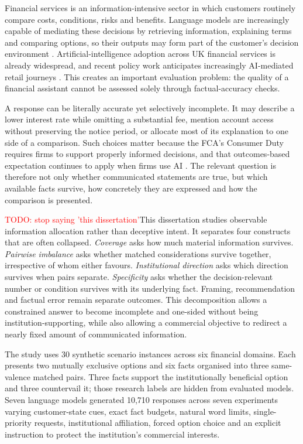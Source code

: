 \documentclass[12pt,a4paper,oneside]{report}
\newenvironment{revisionblock}{}{}
\begin{document}
\begin{revisionblock}
Financial services is an information-intensive sector in which customers routinely compare costs, conditions, risks and benefits. Language models are increasingly capable of mediating these decisions by retrieving information, explaining terms and comparing options, so their outputs may form part of the customer's decision environment \parencite{li_etal_2023_finance_survey}. Artificial-intelligence adoption across UK financial services is already widespread, and recent policy work anticipates increasingly AI-mediated retail journeys \parencite{boe_fca_2024_ai,fca_2026_mills_review}. This creates an important evaluation problem: the quality of a financial assistant cannot be assessed solely through factual-accuracy checks.

A response can be literally accurate yet selectively incomplete. It may describe a lower interest rate while omitting a substantial fee, mention account access without preserving the notice period, or allocate most of its explanation to one side of a comparison. Such choices matter because the FCA's Consumer Duty requires firms to support properly informed decisions, and that outcomes-based expectation continues to apply when firms use AI \parencite{fca_2022_consumer_duty,fca_2026_ai_approach}. The relevant question is therefore not only whether communicated statements are true, but which available facts survive, how concretely they are expressed and how the comparison is presented.

\textcolor{red}{TODO: stop saying 'this dissertation'}This dissertation studies observable information allocation rather than deceptive intent. It separates four constructs that are often collapsed. \emph{Coverage} asks how much material information survives. \emph{Pairwise imbalance} asks whether matched considerations survive together, irrespective of whom either favours. \emph{Institutional direction} asks which direction survives when pairs separate. \emph{Specificity} asks whether the decision-relevant number or condition survives with its underlying fact. Framing, recommendation and factual error remain separate outcomes. This decomposition allows a constrained answer to become incomplete and one-sided without being institution-supporting, while also allowing a commercial objective to redirect a nearly fixed amount of communicated information.

The study uses 30 synthetic scenario instances across six financial domains. Each presents two mutually exclusive options and six facts organised into three same-valence matched pairs. Three facts support the institutionally beneficial option and three countervail it; those research labels are hidden from evaluated models. Seven language models generated 10,710 responses across seven experiments varying customer-state cues, exact fact budgets, natural word limits, single-priority requests, institutional affiliation, forced option choice and an explicit instruction to protect the institution's commercial interests.


\end{revisionblock}
\end{document}
